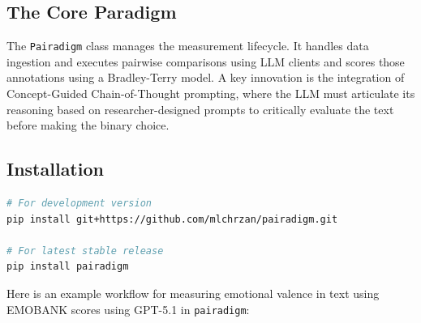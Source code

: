 \documentclass[11pt]{article}
\begin{document}
\subsection{The Core Paradigm}
The \texttt{Pairadigm} class manages the measurement lifecycle. It handles data ingestion and executes pairwise comparisons using LLM clients and scores those annotations using a Bradley-Terry model. A key innovation is the integration of Concept-Guided Chain-of-Thought prompting, where the LLM must articulate its reasoning based on researcher-designed prompts to critically evaluate the text before making the binary choice.

\subsection{Installation}
\begin{lstlisting}[language=bash]
# For development version
pip install git+https://github.com/mlchrzan/pairadigm.git

# For latest stable release
pip install pairadigm
\end{lstlisting}

Here is an example workflow for measuring emotional valence in text using EMOBANK scores \citep{buechel:2022} using GPT-5.1 in \texttt{pairadigm}:
\end{document}
